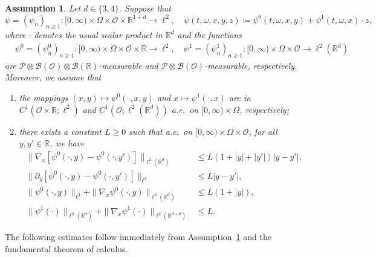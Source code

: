 \documentclass[reqno]{amsart}
\newtheorem{assumption}[Satz]{Assumption}
\newcommand{\R}{\mathbb{R}}
\newcommand{\sP}{\mathscr{P}}
\newcommand{\sB}{\mathscr{B}}
\newcommand{\sO}{\mathscr{O}}
\newcommand{\ce}{\coloneqq}
\newcommand{\1}{\mathbf{1}}
\begin{document}
\begin{assumption}\label{assumption_weakened_setting}
  Let $d\in \{3,4 \}$. Suppose that 
  \begin{equation*}
      \psi=(\psi_n)_{n\geq 1}:[0,\infty)\times \Omega\times\sO\times \R^{1+d}\to \ell^2,\quad \psi(t,\omega,x,y,z) \ce \psi^0(t,\omega,x,y)+\psi^1(t,\omega,x) \cdot z,
  \end{equation*}
  where $\cdot$ denotes the usual scalar product in $\R^d$ and the functions
 \begin{align*}
     &\psi^0=(\psi^0_n)_{n\geq 1}:[0,\infty)\times \Omega\times\sO\times \R\to \ell^2,\quad
     \psi^1=(\psi^1_n)_{n\geq 1}:[0,\infty)\times \Omega\times\sO\to \ell^2(\R^d)
 \end{align*}
 are $\sP \otimes \sB(\sO)\otimes \sB(\R)$-measurable and $\sP \otimes \sB(\sO)$-measurable, respectively.
 Moreover, we assume that 
\begin{enumerate}
    \item the mappings  $(x,y)\mapsto \psi^0(\cdot,x,y)$ and $x\mapsto \psi^1(\cdot,x)$  are in $C^1(\sO\times \R;\ell^2)$ and $C^1(\sO;\ell^2(\R^d))$  a.e.\ on $[0,\infty)\times \Omega$, respectively;
    \item  there exists a constant $L\geq0$ such that a.e.\ on
    $[0, \infty)\times\Omega\times\sO$, for all $y,y'\in\R$, we have
    \begin{align}
        \|\nabla_x[
            \psi^0(\cdot,y)-\psi^0(\cdot,y')
        ]\|_{\ell^2(\R^d)}
        &\leq L(1+|y|+|y'|)|y-y'|, \label{eq:psi0-gradx-local-lipschitz}
        \\
                \|\partial_y[
            \psi^0(\cdot,y)-\psi^0(\cdot,y')
        ]\|_{\ell^2}
        &\leq L|y-y'|, \label{eq:psi0-dy-lipschitz}
        \\
        \|\psi^0(\cdot,y)\|_{\ell^2}+ \|\nabla_x\psi^0(\cdot,y)\|_{\ell^2(\R^d)}
        &\leq L(1+|y|), \label{eq:psi0-linear-growth}
        \\
        \|\psi^1(\cdot)\|_{\ell^2(\R^d)}
        +
        \|\nabla_x\psi^1(\cdot)\|_{\ell^2(\R^{d\times d})}
        &\leq L. \label{eq:psi1-uniform-bound}
    \end{align}
\end{enumerate}
\end{assumption}

The following estimates follow immediately from Assumption~\ref{assumption_weakened_setting} and the fundamental theorem of calculus.
\end{document}
